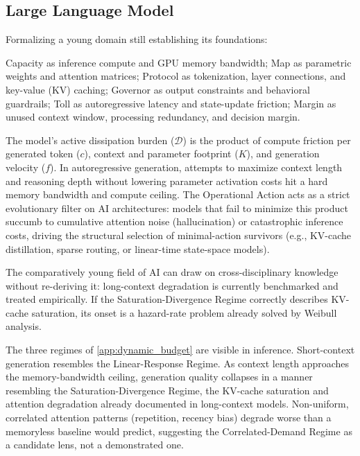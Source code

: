 \subsection{Large Language Model}
Formalizing a young domain still establishing its foundations:
\begin{description}[leftmargin=0pt]
    \item[Architecture] Capacity as inference compute and GPU memory bandwidth; Map as parametric weights and attention matrices; Protocol as tokenization, layer connections, and key-value (KV) caching; Governor as output constraints and behavioral guardrails; Toll as autoregressive latency and state-update friction; Margin as unused context window, processing redundancy, and decision margin.
    \item[Dynamics] The model's active dissipation burden ($\mathcal{D}$) is the product of compute friction per generated token ($c$), context and parameter footprint ($K$), and generation velocity ($f$). In autoregressive generation, attempts to maximize context length and reasoning depth without lowering parameter activation costs hit a hard memory bandwidth and compute ceiling. The Operational Action acts as a strict evolutionary filter on AI architectures: models that fail to minimize this product succumb to cumulative attention noise (hallucination) or catastrophic inference costs, driving the structural selection of minimal-action survivors (e.g., KV-cache distillation, sparse routing, or linear-time state-space models).
    \item[Cross-Domain Transfer] The comparatively young field of AI can draw on cross-disciplinary knowledge without re-deriving it: long-context degradation is currently benchmarked and treated empirically. If the Saturation-Divergence Regime correctly describes KV-cache saturation, its onset is a hazard-rate problem already solved by Weibull analysis.
    \item[Contention Regimes] The three regimes of \cref{app:dynamic_budget} are visible in inference. Short-context generation resembles the Linear-Response Regime. As context length approaches the memory-bandwidth ceiling, generation quality collapses in a manner resembling the Saturation-Divergence Regime, the KV-cache saturation and attention degradation already documented in long-context models. Non-uniform, correlated attention patterns (repetition, recency bias) degrade worse than a memoryless baseline would predict, suggesting the Correlated-Demand Regime as a candidate lens, not a demonstrated one.
\end{description}

